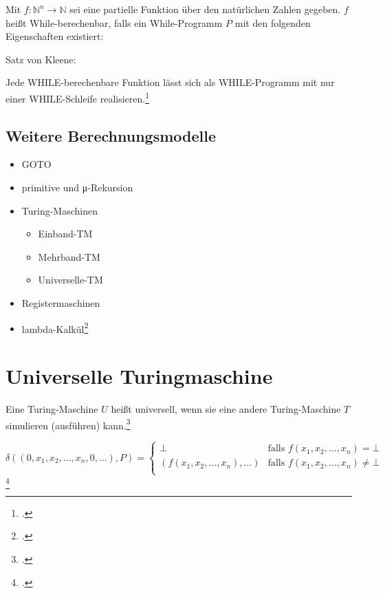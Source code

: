 \documentclass{lehramt-informatik-haupt}
\begin{document}
Mit $f : \mathbb{N}^n \rightarrow \mathbb{N}$ sei eine partielle
Funktion über den natürlichen Zahlen gegeben. $f$ heißt
While-berechenbar, falls ein While-Programm $P$ mit den folgenden
Eigenschaften existiert:

Satz von Kleene:

Jede WHILE-berechenbare Funktion lässt sich als WHILE-Programm mit nur
einer WHILE-Schleife realisieren.\footcite[Seite 13]{theo:fs:4}

\subsection{Weitere Berechnungsmodelle}

\begin{itemize}
\item GOTO
\item primitive und μ-Rekursion

\item Turing-Maschinen
\begin{itemize}
\item Einband-TM
\item Mehrband-TM
\item Universelle-TM

\end{itemize}
\item Registermaschinen
\item lambda-Kalkül\footcite[Seite 17]{theo:fs:4}
\end{itemize}

\section{Universelle Turingmaschine}


Eine Turing-Maschine $U$ heißt universell, wenn sie eine andere
Turing-Maschine $T$ simulieren (ausführen) kann.\footcite[Seite
23]{theo:fs:4}

\begin{equation*}
\delta((0,x_1,x_2,\dots,x_n,0,\dots), P) =
\begin{cases}
\bot &
\text{falls } f(x_1,x_2,\dots,x_n) = \bot\\

(f(x_1,x_2,\dots,x_n), \dots) &
\text{falls }f(x_1,x_2,\dots,x_n) \neq \bot\\
\end{cases}
\end{equation*}\footcite[Seite 261]{hoffmann}
\end{document}
